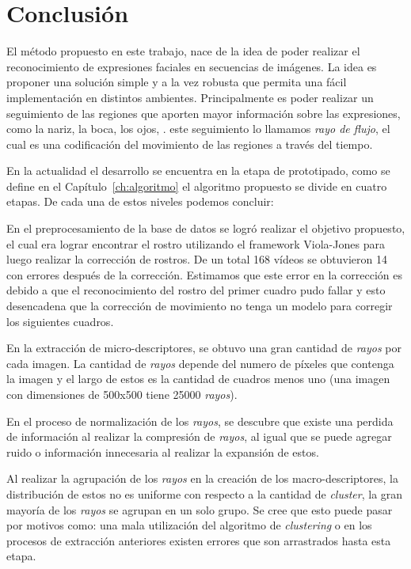 \chapter[Conclusión]{Conclusión}
\label{ch:conclusion}

El método propuesto en este trabajo, nace de la idea de poder realizar el reconocimiento de expresiones faciales en secuencias de imágenes. La idea es proponer una solución simple y a la vez robusta que permita una fácil implementación en distintos ambientes. Principalmente es poder realizar un seguimiento de las regiones que aporten mayor información sobre las expresiones, como la nariz, la boca, los ojos, \etc. este seguimiento lo llamamos \textit{rayo de flujo}, el cual es una codificación del movimiento de las regiones a través del tiempo.

En la actualidad el desarrollo se encuentra en la etapa de prototipado, como se define en el Capítulo~\ref{ch:algoritmo} el algoritmo propuesto se divide en cuatro etapas. De cada una de estos niveles podemos concluir:

En el preprocesamiento de la base de datos se logró realizar el objetivo propuesto, el cual era lograr encontrar el rostro utilizando el framework Viola-Jones para luego realizar la corrección de rostros. De un total 168 vídeos se obtuvieron 14 con errores después de la corrección. Estimamos que este error en la corrección es debido a que el reconocimiento del rostro del primer cuadro pudo fallar y esto desencadena que la corrección de movimiento no tenga un modelo para corregir los siguientes cuadros.

En la extracción de micro-descriptores, se obtuvo una gran cantidad de \textit{rayos} por cada imagen. La cantidad de \textit{rayos} depende del numero de píxeles que contenga la imagen y el largo de estos es la cantidad de cuadros menos uno (\eg una imagen con dimensiones de 500x500 tiene 25000 \textit{rayos}).

En el proceso de normalización de los \textit{rayos}, se descubre que existe una perdida de información al realizar la compresión de \textit{rayos}, al igual que se puede agregar ruido o información innecesaria al realizar la expansión de estos.

Al realizar la agrupación de los \textit{rayos} en la creación de los macro-descriptores, la distribución de estos no es uniforme con respecto a la cantidad de \textit{cluster}, la gran mayoría de los \textit{rayos} se agrupan en un solo grupo. Se cree que esto puede pasar por motivos como: una mala utilización del algoritmo de \textit{clustering} o en los procesos de extracción anteriores existen errores que son arrastrados hasta esta etapa.


